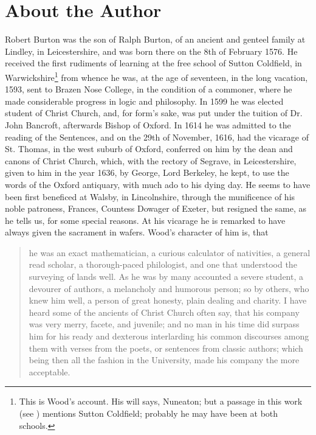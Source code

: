 \chapter{About the Author}
Robert Burton was the son of Ralph Burton, of an ancient and genteel family at Lindley, in Leicestershire, and was born there on the 8th of February 1576.
He received the first rudiments of learning at the free school of Sutton Coldfield, in Warwickshire\footnote{This is Wood's account.
His will says, Nuneaton; but a passage in this work (see ) mentions Sutton Coldfield; probably he may have been at both schools.} from whence he was, at the age of seventeen, in the long vacation, 1593, sent to Brazen Nose College, in the condition of a commoner, where he made considerable progress in logic and philosophy.
In 1599 he was elected student of Christ Church, and, for form's sake, was put under the tuition of Dr. John Bancroft, afterwards Bishop of Oxford.
In 1614 he was admitted to the reading of the Sentences, and on the 29th of November, 1616, had the vicarage of St. Thomas, in the west suburb of Oxford, conferred on him by the dean and canons of Christ Church, which, with the rectory of Segrave, in Leicestershire, given to him in the year 1636, by George, Lord Berkeley, he kept, to use the words of the Oxford antiquary, with much ado to his dying day.
He seems to have been first beneficed at Walsby, in Lincolnshire, through the munificence of his noble patroness, Frances, Countess Dowager of Exeter, but resigned the same, as he tells us, for some special reasons.
At his vicarage he is remarked to have always given the sacrament in wafers.
Wood's character of him is, that \blockquote{he was an exact mathematician, a curious calculator of nativities, a general read scholar, a thorough-paced philologist, and one that understood the surveying of lands well.
As he was by many accounted a severe student, a devourer of authors, a melancholy and humorous person; so by others, who knew him well, a person of great honesty, plain dealing and charity.
I have heard some of the ancients of Christ Church often say, that his company was very merry, facete, and juvenile; and no man in his time did surpass him for his ready and dexterous interlarding his common discourses among them with verses from the poets, or sentences from classic authors; which being then all the fashion in the University, made his company the more acceptable.}

